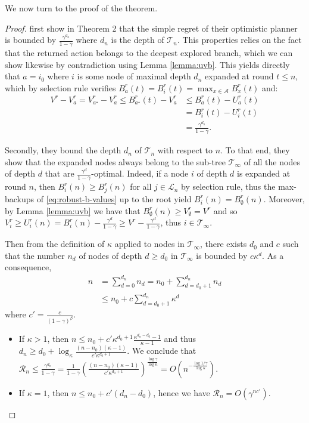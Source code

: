 \documentclass{article}
\begin{document}
We now turn to the proof of the theorem.

\begin{proof}
	\citet{Hren2008} first show in Theorem 2 that the simple regret of their optimistic planner is bounded by $\frac{\gamma^{d_n}}{1 - \gamma}$ where $d_n$ is the depth of $\mathcal{T}_n$. This properties relies on the fact that the returned action belongs to the deepest explored branch, which we can show likewise by contradiction using Lemma \ref{lemma:uvb}. This yields directly that $a = i_0$ where $i$ is some node of maximal depth $d_n$ expanded at round $t\leq n$, which by selection rule verifies $B_a^r(t) = B_i^r(t) = \max_{x\in\mathcal{A}} B_x^r(t)$ and:
	\begin{align*}
	\label{eq:Rndn}
	V^r - V_a^r = V_{a^{\star}}^r - V_a^r  \leq B_{a^{\star}}^r(t) - V_a^r &\leq B_{a}^r(t) - U_a^r(t) \\
	&= B_{i}^r(t) - U_i^r(t) \\
	&= \frac{\gamma^{d_n}}{1-\gamma}.
	\end{align*}
	
	Secondly, they bound the depth $d_n$ of $\mathcal{T}_n$ with respect to $n$. To that end, they show that the expanded nodes always belong to the sub-tree $\mathcal{T}_\infty$ of all the nodes of depth $d$ that are $\frac{\gamma^d}{1-\gamma}$-optimal. Indeed, if a node $i$ of depth $d$ is expanded at round $n$, then $B_i^r(n) \geq B_j^r(n)$ for all $j\in \mathcal{L}_n$ by selection rule, thus the max-backups of \eqref{eq:robust-b-values} up to the root yield $B^r_i(n) = B_\emptyset^r(n)$. Moreover, by Lemma \ref{lemma:uvb} we have that $B_\emptyset^r(n) \geq V_\emptyset^r = V^r$ and so $V_i^r \geq U_i^r(n) = B_i^r(n) - \frac{\gamma^d}{1-\gamma} \geq V^r - \frac{\gamma^d}{1-\gamma}$, thus $i \in \mathcal{T}_\infty$.
	
	Then from the definition of $\kappa$ applied to nodes in $\mathcal{T}_\infty$, there exists $d_0$ and $c$ such that the number $n_d$ of nodes of depth $d \geq d_0$ in $\mathcal{T}_\infty$ is bounded by $c\kappa^d$. As a consequence, 
	\begin{eqnarray*}
		n &= \sum_{d=0}^{d_n} n_d = n_0 + \sum_{d=d_0+1}^{d_n} n_d \\
		&\leq n_0 + c\sum_{d={d_0+1}}^{d_n} \kappa^d
	\end{eqnarray*}
	where $c'=\frac{c}{(1-\gamma)^\beta}$.
	
	\begin{itemize}
		\item If $\kappa > 1$, then $n \leq n_0 + c'\kappa^{d_0+1}\frac{\kappa^{d_n-d_0}-1}{\kappa-1}$ and thus $d_n \geq d_0 + \log_\kappa \frac{(n-n_0)(\kappa - 1)}{c'\kappa^{d_0+1}}$.
		We conclude that $\mathcal{R}_n \leq \frac{\gamma^{d_n}}{1-\gamma} = \frac{1}{1-\gamma} \left( \frac{(n-n_0)(\kappa - 1)}{c'\kappa^{d_0+1}} \right)^\frac{\log \gamma}{\log \kappa} = O\left(n^{-\frac{\log 1/\gamma}{\log \kappa}}\right)$.
		
		\item If $\kappa = 1$, then $n \leq n_0 + c'(d_n-d_0)$, hence we have $\mathcal{R}_n = O\left(\gamma^{nc'}\right)$.
	\end{itemize}
\end{proof}
\end{document}
